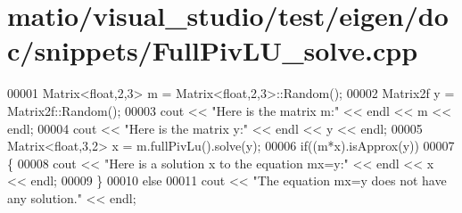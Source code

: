 \hypertarget{matio_2visual__studio_2test_2eigen_2doc_2snippets_2_full_piv_l_u__solve_8cpp_source}{}\section{matio/visual\+\_\+studio/test/eigen/doc/snippets/\+Full\+Piv\+L\+U\+\_\+solve.cpp}
\label{matio_2visual__studio_2test_2eigen_2doc_2snippets_2_full_piv_l_u__solve_8cpp_source}

\begin{DoxyCode}
00001 Matrix<float,2,3> m = Matrix<float,2,3>::Random();
00002 Matrix2f y = Matrix2f::Random();
00003 cout << \textcolor{stringliteral}{"Here is the matrix m:"} << endl << m << endl;
00004 cout << \textcolor{stringliteral}{"Here is the matrix y:"} << endl << y << endl;
00005 Matrix<float,3,2> x = m.fullPivLu().solve(y);
00006 \textcolor{keywordflow}{if}((m*x).isApprox(y))
00007 \{
00008   cout << \textcolor{stringliteral}{"Here is a solution x to the equation mx=y:"} << endl << x << endl;
00009 \}
00010 \textcolor{keywordflow}{else}
00011   cout << \textcolor{stringliteral}{"The equation mx=y does not have any solution."} << endl;
\end{DoxyCode}
